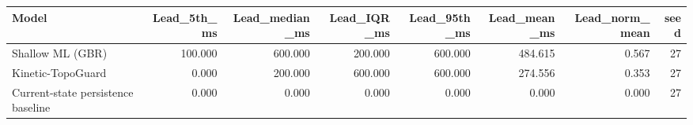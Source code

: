 \begin{tabular}{lrrrrrrr}
\toprule
Model & Lead\_5th\_ms & Lead\_median\_ms & Lead\_IQR\_ms & Lead\_95th\_ms & Lead\_mean\_ms & Lead\_norm\_mean & seed \\
\midrule
Shallow ML (GBR) & 100.000 & 600.000 & 200.000 & 600.000 & 484.615 & 0.567 & 27 \\
Kinetic-TopoGuard & 0.000 & 200.000 & 600.000 & 600.000 & 274.556 & 0.353 & 27 \\
Current-state persistence baseline & 0.000 & 0.000 & 0.000 & 0.000 & 0.000 & 0.000 & 27 \\
\bottomrule
\end{tabular}